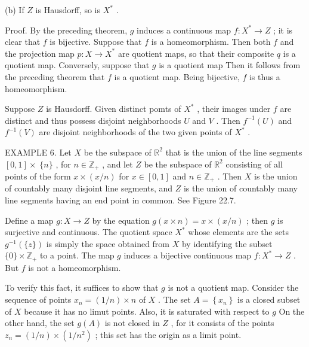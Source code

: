 \documentclass[10pt]{article}
\begin{document}
(b) If \(Z\) is Hausdorff, so is \({X}^{ * }\) .

Proof. By the preceding theorem, \(g\) induces a continuous map \(f : {X}^{ * } \rightarrow  Z\) ; it is clear that \(f\) is bijective. Suppose that \(f\) is a homeomorphism. Then both \(f\) and the projection map \(p : X \rightarrow  {X}^{ * }\) are quotient maps, so that their composite \(q\) is a quotient map. Conversely, suppose that \(g\) is a quotient map Then it follows from the preceding theorem that \(f\) is a quotient map. Being bijective, \(f\) is thus a homeomorphism.

Suppose \(Z\) is Hausdorff. Given distinct pomts of \({X}^{ * }\) , their images under \(f\) are distinct and thus possess disjoint neighborhoods \(U\) and \(V\) . Then \({f}^{-1}\left( U\right)\) and \({f}^{-1}\left( V\right)\) are disjoint neighborhoods of the two given points of \({X}^{ * }\) .

EXAMPLE 6. Let \(X\) be the subspace of \({\mathbb{R}}^{2}\) that is the union of the line segments \(\left\lbrack  {0,1}\right\rbrack   \times \; \{ n\}\) , for \(n \in  {\mathbb{Z}}_{ + }\) , and let \(Z\) be the subspace of \({\mathbb{R}}^{2}\) consisting of all points of the form \(x \times  \left( {x/n}\right)\) for \(x \in  \left\lbrack  {0,1}\right\rbrack\) and \(n \in  {\mathbb{Z}}_{ + }\) . Then \(X\) is the union of countably many disjoint line segments, and \(Z\) is the union of countably many line segments having an end point in common. See Figure 22.7.

Define a map \(g : X \rightarrow  Z\) by the equation \(g\left( {x \times  n}\right)  = x \times  \left( {x/n}\right)\) ; then \(g\) is surjective and continuous. The quotient space \({X}^{ * }\) whose elements are the sets \({g}^{-1}\left( {\{ z\} }\right)\) is simply the space obtained from \(X\) by identifying the subset \(\{ 0\}  \times  {\mathbb{Z}}_{ + }\) to a point. The map \(g\) induces a bijective continuous map \(f : {X}^{ * } \rightarrow  Z\) . But \(f\) is not a homeomorphism.

To verify this fact, it suffices to show that \(g\) is not a quotient map. Consider the sequence of points \({x}_{n} = \left( {1/n}\right)  \times  n\) of \(X\) . The set \(A = \left\{  {x}_{n}\right\}\) is a closed subset of \(X\) because it has no limut points. Also, it is saturated with respect to \(g\) On the other hand, the set \(g\left( A\right)\) is not closed in \(Z\) , for it consists of the points \({z}_{n} = \left( {1/n}\right)  \times  \left( {1/{n}^{2}}\right)\) ; this set has the origin as a limit point.
\end{document}
